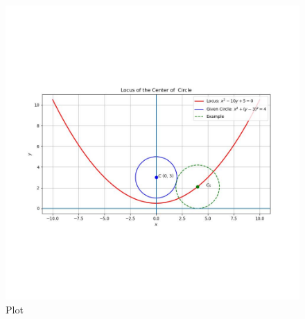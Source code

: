 \documentclass[journal]{IEEEtran}
\begin{document}
\begin{figure}[h!]
	\centering
	\includegraphics[width=0.8\columnwidth]{figs/plot_c.jpg}
	\caption*{Plot}
	\label{fig:fig}
\end{figure}
\end{document}
